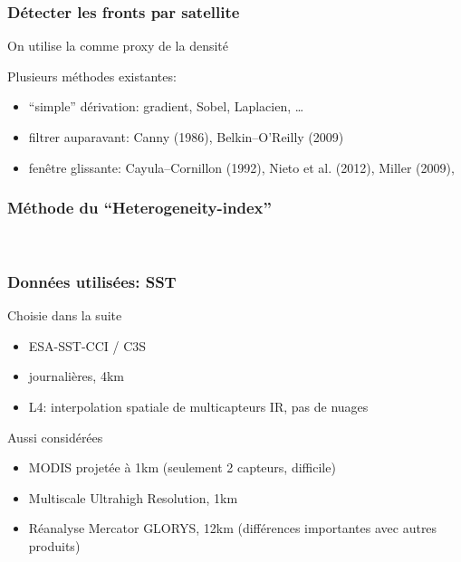 \begin{frame}
\end{frame}


\begin{frame}
  \frametitle{Détecter les fronts par satellite}

  \begin{block}{}
    On utilise la  comme proxy de la densité
  \end{block}

  \begin{block}{}
    Plusieurs méthodes existantes:
    \begin{itemize}
            \setlength{\itemsep}{1.2em}
      \item “simple” dérivation: gradient, Sobel, Laplacien, \dots
      \item filtrer auparavant: Canny (1986), Belkin--O'Reilly (2009)
      \item fenêtre glissante: Cayula--Cornillon (1992), Nieto et al. (2012), Miller (2009), 
    \end{itemize}
  \end{block}
\end{frame}


\begin{frame}
  \frametitle{Méthode du “Heterogeneity-index”}
  \\[1em]

\end{frame}


\begin{frame}
  \frametitle{Données utilisées: SST}

  \begin{block}{Choisie dans la suite}
    \begin{itemize}
      \item ESA-SST-CCI / C3S
      \item journalières, 4km
      \item L4: interpolation spatiale de multicapteurs IR, pas de nuages
    \end{itemize}
  \end{block}

  \begin{block}{Aussi considérées}
    \begin{itemize}
      \item MODIS projetée à 1km (seulement 2 capteurs, difficile)
      \item Multiscale Ultrahigh Resolution, 1km
      \item Réanalyse Mercator GLORYS, 12km (différences importantes avec autres produits)
    \end{itemize}
  \end{block}

\end{frame}

